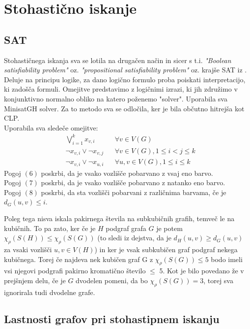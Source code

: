 \documentclass[11pt,a4paper,titlepage]{article}
\begin{document}
\section{Stohastično iskanje}

\subsection{SAT}

Stohastičnega iskanja sva se lotila na drugačen način in sicer s t.i. \emph{"Boolean satisfiability problem"} oz. \emph{"propositional satisfiability problem"} oz.
krajše SAT iz \cite{SHAO20153588}. Deluje na principu logike, za dano logično formulo proba poiskati interpretacijo, ki zadošča formuli.  Omejitve predstavimo z logičnimi izrazi, ki jih
združimo v konjunktivno normalno obliko na katero poženemo "solver". Uporabila sva MinisatGH solver. Za to metodo sva se odločila, ker je bila občutno
hitrejša kot CLP.\\
Uporabila sva sledeče omejitve:
\begin{align}
	\label{eq:f.5} & \bigvee_{i=1}^k x_{v, i} && \forall v\in V(G) \\
	\label{eq:f.6} & \neg x_{v, i} \lor \neg x_{v, j} && \forall v \in V(G), 1 \leq i < j \leq k\\
	\label{eq:f.7} & \neg x_{v, i} \lor \neg x_{u, i} && \forall u, v \in V(G), 1 \leq i \leq k
\end{align}
Pogoj $(6)$ poskrbi, da je vsako vozlišče pobarvano z vsaj eno barvo. \\
Pogoj $(7)$ poskrbi, da je vsako vozlišče pobarvano z natanko eno barvo. \\
Pogoj $(8)$ poskrbi, da sta vozlišči pobarvani z različnima barvama, če je $d_G(u, v) \leq i$.

Poleg tega nisva iskala pakirnega števila na subkubičnih grafih, temveč le na kubičnih. To pa zato, ker če je $H$ podgraf grafa $G$ je potem
$\chi_\rho(S(H)) \leq \chi_\rho(S(G))$ (to sledi iz dejstva, da je $d_H(u, v) \geq d_G(u, v)$ za vsaki vozlišči $u, v \in V(H)$) in ker je
vsak subkubičen graf podgraf nekega kubičnega. Torej če najdeva nek kubičen graf G z $\chi_\rho(S(G)) \leq 5$ bodo imeli vsi njegovi podgrafi pakirno kromatično število $\leq$ 5. Kot je bilo povedano že v prejšnjem delu, če je $G$ dvodelen pomeni, da bo $\chi_\rho(S(G)) = 3$, torej
sva ignorirala tudi dvodelne grafe.

\subsection{Lastnosti grafov pri stohastipnem iskanju}
\end{document}

